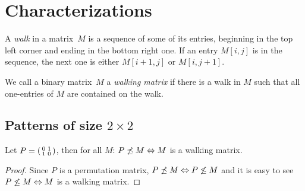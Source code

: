 \newsavebox{\smlmat}
\newsavebox{\smlmatb}
\newsavebox{\smlmatc}

\section{Characterizations}
\begin{defn}
A \emph{walk} in a matrix~$M$ is a sequence of some of its entries, beginning in the top left corner and ending in the bottom right one. If an entry $M[i,j]$ is in the sequence, the next one is either $M[i+1,j]$ or $M[i,j+1]$.
\end{defn}
\begin{defn}
We call a binary matrix~$M$ a \emph{walking matrix} if there is a walk in $M$ such that all one-entries of $M$ are contained on the walk.
\end{defn}

\subsection{Patterns of size $2\times2$}
\begin{thm}
Let $P=\left(\begin{smallmatrix}0&1\\1&0\end{smallmatrix}\right)$, then for all $M$: $P\not\preceq M\Leftrightarrow M$ is a walking matrix.
\end{thm}
\begin{proof}
Since $P$ is a permutation matrix, $P\not\preceq M\Leftrightarrow P\not\leq M$ and it is easy to see $P\not\leq M\Leftrightarrow M$ is a walking matrix.
\end{proof}

